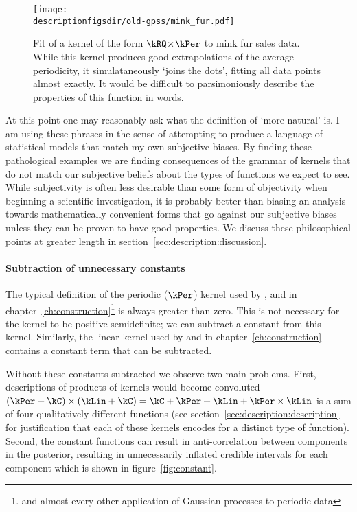 \begin{figure}[ht]
  \centering
  \texttt{[image: \\descriptionfigsdir/old-gpss/mink\_fur.pdf]}
\caption[The pathological properties of the rational quadratic kernel when applied to mink fur sales data]{
Fit of a kernel of the form $\kRQ \kerntimes \kPer$ to mink fur sales data.
While this kernel produces good extrapolations of the average periodicity, it simulataneously `joins the dots', fitting all data points almost exactly.
It would be difficult to parsimoniously describe the properties of this function in words.
}
\label{fig:description:rq_per}
\end{figure}

At this point one may reasonably ask what the definition of `more natural' is.
I am using these phrases in the sense of attempting to produce a language of statistical models that match my own subjective biases.
By finding these pathological examples we are finding consequences of the grammar of kernels that do not match our subjective beliefs about the types of functions we expect to see.
While subjectivity is often less desirable than some form of objectivity when beginning a scientific investigation, it is probably better than biasing an analysis towards mathematically convenient forms that go against our subjective biases unless they can be proven to have good properties.
We discuss these philosophical points at greater length in section~\ref{sec:description:discussion}.

\paragraph{Subtraction of unnecessary constants}

The typical definition of the periodic ($\kPer$) kernel \citep[e.g.][]{Rasmussen2006-ml} used by \citet{Duvenaud2013-dn}, \citet{Kronberger_undated-vf} and in chapter~\ref{ch:construction}\footnote{and almost every other application of Gaussian processes to periodic data} is always greater than zero.
This is not necessary for the kernel to be positive semidefinite; we can subtract a constant from this kernel.
Similarly, the linear kernel used by \citet{Duvenaud2013-dn} and in chapter~\ref{ch:construction} contains a constant term that can be subtracted.

Without these constants subtracted we observe two main problems.
First, descriptions of products of kernels would become convoluted \eg $(\kPer + \kC) \times (\kLin + \kC) = \kC + \kPer + \kLin + \kPer \times \kLin$ is a sum of four qualitatively different functions (see section~\ref{sec:description:description} for justification that each of these kernels encodes for a distinct type of function).
Second, the constant functions can result in anti-correlation between components in the posterior, resulting in unnecessarily inflated credible intervals for each component which is shown in figure~\ref{fig:constant}.

